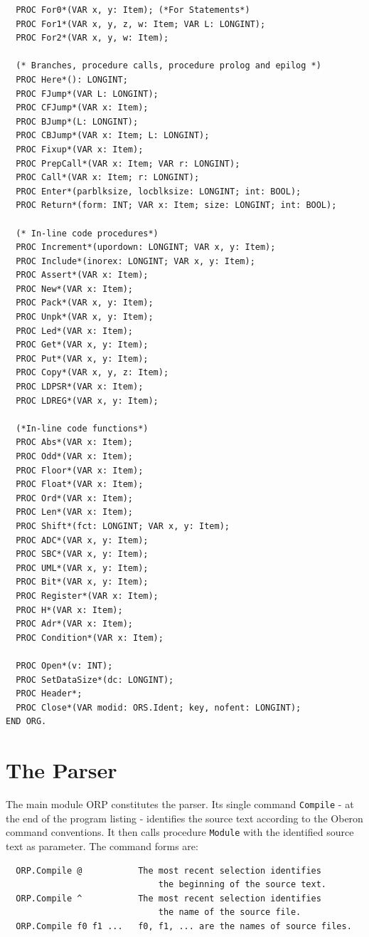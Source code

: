 \begin{verbatim}
  PROC For0*(VAR x, y: Item); (*For Statements*)
  PROC For1*(VAR x, y, z, w: Item; VAR L: LONGINT);
  PROC For2*(VAR x, y, w: Item);

  (* Branches, procedure calls, procedure prolog and epilog *)
  PROC Here*(): LONGINT;
  PROC FJump*(VAR L: LONGINT);
  PROC CFJump*(VAR x: Item);
  PROC BJump*(L: LONGINT);
  PROC CBJump*(VAR x: Item; L: LONGINT);
  PROC Fixup*(VAR x: Item);
  PROC PrepCall*(VAR x: Item; VAR r: LONGINT);
  PROC Call*(VAR x: Item; r: LONGINT);
  PROC Enter*(parblksize, locblksize: LONGINT; int: BOOL);
  PROC Return*(form: INT; VAR x: Item; size: LONGINT; int: BOOL);

  (* In-line code procedures*)
  PROC Increment*(upordown: LONGINT; VAR x, y: Item);
  PROC Include*(inorex: LONGINT; VAR x, y: Item);
  PROC Assert*(VAR x: Item);
  PROC New*(VAR x: Item);
  PROC Pack*(VAR x, y: Item);
  PROC Unpk*(VAR x, y: Item);
  PROC Led*(VAR x: Item);
  PROC Get*(VAR x, y: Item);
  PROC Put*(VAR x, y: Item);
  PROC Copy*(VAR x, y, z: Item);
  PROC LDPSR*(VAR x: Item);
  PROC LDREG*(VAR x, y: Item);

  (*In-line code functions*)
  PROC Abs*(VAR x: Item);
  PROC Odd*(VAR x: Item);
  PROC Floor*(VAR x: Item);
  PROC Float*(VAR x: Item);
  PROC Ord*(VAR x: Item);
  PROC Len*(VAR x: Item);
  PROC Shift*(fct: LONGINT; VAR x, y: Item);
  PROC ADC*(VAR x, y: Item);
  PROC SBC*(VAR x, y: Item);
  PROC UML*(VAR x, y: Item);
  PROC Bit*(VAR x, y: Item);
  PROC Register*(VAR x: Item);
  PROC H*(VAR x: Item);
  PROC Adr*(VAR x: Item);
  PROC Condition*(VAR x: Item);

  PROC Open*(v: INT);
  PROC SetDataSize*(dc: LONGINT);
  PROC Header*;
  PROC Close*(VAR modid: ORS.Ident; key, nofent: LONGINT);
END ORG.
\end{verbatim}

\section{The Parser}
The main module ORP constitutes the parser. Its single command \verb|Compile| - at the end of the
program listing - identifies the source text according to the Oberon command conventions. It then
calls procedure \verb|Module| with the identified source text as parameter. The command forms are:
\begin{verbatim}
  ORP.Compile @	          The most recent selection identifies
                              the beginning of the source text.
  ORP.Compile ^	          The most recent selection identifies
                              the name of the source file.
  ORP.Compile f0 f1 ...   f0, f1, ... are the names of source files.
\end{verbatim}

